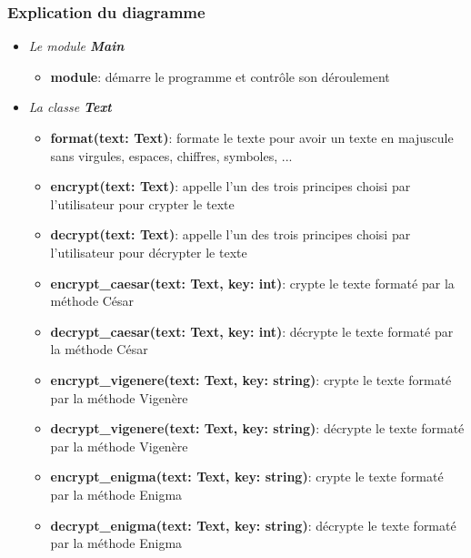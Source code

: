 \documentclass[a4paper,12pt,abstracton,titlepage]{scrartcl}
\begin{document}
\subsubsection{Explication du diagramme}
\vspace{0.3cm}
\begin{itemize}
\item \textit{Le module \textbf{Main}}\vspace{0.3cm}
\begin{itemize}
\item \textbf{module}:
démarre le programme et contrôle son déroulement\\
\end{itemize}\vspace{0.4cm}
\item \textit{La classe \textbf{Text}}
\vspace{0.3cm}
\begin{itemize}
\item \textbf{format(text: Text)}:
formate le texte pour avoir un texte en majuscule sans virgules, espaces, chiffres, symboles, ...\\
\item \textbf{encrypt(text: Text)}:
appelle l'un des trois principes choisi par l'utilisateur pour crypter le texte\\
\item \textbf{decrypt(text: Text)}:
appelle l'un des trois principes choisi par l'utilisateur pour décrypter le texte\\
\item \textbf{encrypt\_caesar(text: Text, key: int)}:
crypte le texte formaté par la méthode César\\
\item \textbf{decrypt\_caesar(text: Text, key: int)}:
décrypte le texte formaté par la méthode César\\
\item \textbf{encrypt\_vigenere(text: Text, key: string)}:
crypte le texte formaté par la méthode Vigenère\\
\item \textbf{decrypt\_vigenere(text: Text, key: string)}:
décrypte le texte formaté par la méthode Vigenère\\
\item \textbf{encrypt\_enigma(text: Text, key: string)}:
crypte le texte formaté par la méthode Enigma\\
\item \textbf{decrypt\_enigma(text: Text, key: string)}:
décrypte le texte formaté par la méthode Enigma\\

\end{itemize}
\end{itemize}
\end{document}
